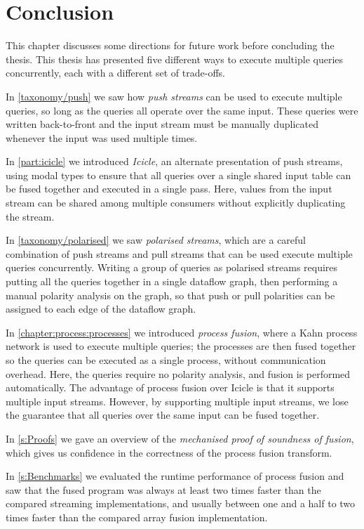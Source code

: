 \chapter{Conclusion}
\label{conclusion}

This chapter discusses some directions for future work before concluding the thesis.
This thesis has presented five different ways to execute multiple queries concurrently, each with a different set of trade-offs.

In \cref{taxonomy/push} we saw how \emph{push streams} can be used to execute multiple queries, so long as the queries all operate over the same input.
These queries were written back-to-front and the input stream must be manually duplicated whenever the input was used multiple times.

In \cref{part:icicle} we introduced \emph{Icicle}, an alternate presentation of push streams, using modal types to ensure that all queries over a single shared input table can be fused together and executed in a single pass.
Here, values from the input stream can be shared among multiple consumers without explicitly duplicating the stream.

In \cref{taxonomy/polarised} we saw \emph{polarised streams}, which are a careful combination of push streams and pull streams that can be used execute multiple queries concurrently.
Writing a group of queries as polarised streams requires putting all the queries together in a single dataflow graph, then performing a manual polarity analysis on the graph, so that push or pull polarities can be assigned to each edge of the dataflow graph.

In \cref{chapter:process:processes} we introduced \emph{process fusion}, where a Kahn process network is used to execute multiple queries; the processes are then fused together so the queries can be executed as a single process, without communication overhead.
Here, the queries require no polarity analysis, and fusion is performed automatically.
The advantage of process fusion over Icicle is that it supports multiple input streams.
However, by supporting multiple input streams, we lose the guarantee that all queries over the same input can be fused together.

In \cref{s:Proofs} we gave an overview of the \emph{mechanised proof of soundness of fusion}, which gives us confidence in the correctness of the process fusion transform.

In \cref{s:Benchmarks} we evaluated the runtime performance of process fusion and saw that the fused program was always at least two times faster than the compared streaming implementations, and usually between one and a half to two times faster than the compared array fusion implementation.

